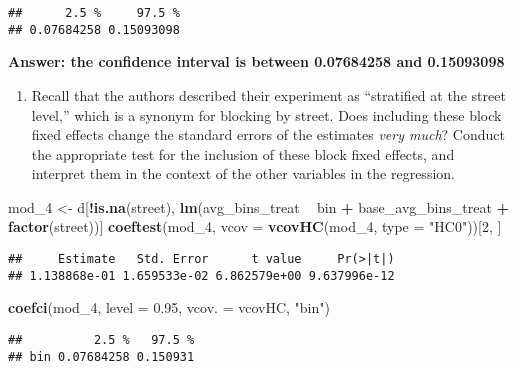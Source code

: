\documentclass[
]{article}
\newenvironment{Shaded}{\begin{snugshade}}{\end{snugshade}}
\newcommand{\DataTypeTok}[1]{\textcolor[rgb]{0.13,0.29,0.53}{#1}}
\newcommand{\DecValTok}[1]{\textcolor[rgb]{0.00,0.00,0.81}{#1}}
\newcommand{\FloatTok}[1]{\textcolor[rgb]{0.00,0.00,0.81}{#1}}
\newcommand{\KeywordTok}[1]{\textcolor[rgb]{0.13,0.29,0.53}{\textbf{#1}}}
\newcommand{\NormalTok}[1]{#1}
\newcommand{\OperatorTok}[1]{\textcolor[rgb]{0.81,0.36,0.00}{\textbf{#1}}}
\newcommand{\StringTok}[1]{\textcolor[rgb]{0.31,0.60,0.02}{#1}}
\providecommand{\tightlist}{%
  \setlength{\itemsep}{0pt}\setlength{\parskip}{0pt}}
\begin{document}
\begin{verbatim}
##      2.5 %     97.5 % 
## 0.07684258 0.15093098
\end{verbatim}

\textbf{Answer: the confidence interval is between 0.07684258 and
0.15093098}

\begin{enumerate}
\def\labelenumi{\arabic{enumi}.}
\setcounter{enumi}{3}
\tightlist
\item
  Recall that the authors described their experiment as ``stratified at
  the street level,'' which is a synonym for blocking by street. Does
  including these block fixed effects change the standard errors of the
  estimates \emph{very much}? Conduct the appropriate test for the
  inclusion of these block fixed effects, and interpret them in the
  context of the other variables in the regression.
\end{enumerate}

\begin{Shaded}
\begin{Highlighting}[]
\NormalTok{mod_}\DecValTok{4}\NormalTok{ <-}\StringTok{ }\NormalTok{d[}\OperatorTok{!}\KeywordTok{is.na}\NormalTok{(street), }\KeywordTok{lm}\NormalTok{(avg_bins_treat }\OperatorTok{~}\StringTok{ }\NormalTok{bin }\OperatorTok{+}\StringTok{ }\NormalTok{base_avg_bins_treat }\OperatorTok{+}\StringTok{ }\KeywordTok{factor}\NormalTok{(street))]}
\KeywordTok{coeftest}\NormalTok{(mod_}\DecValTok{4}\NormalTok{, }\DataTypeTok{vcov =} \KeywordTok{vcovHC}\NormalTok{(mod_}\DecValTok{4}\NormalTok{, }\DataTypeTok{type =} \StringTok{"HC0"}\NormalTok{))[}\DecValTok{2}\NormalTok{, ]}
\end{Highlighting}
\end{Shaded}

\begin{verbatim}
##     Estimate   Std. Error      t value     Pr(>|t|) 
## 1.138868e-01 1.659533e-02 6.862579e+00 9.637996e-12
\end{verbatim}

\begin{Shaded}
\begin{Highlighting}[]
\KeywordTok{coefci}\NormalTok{(mod_}\DecValTok{4}\NormalTok{, }\DataTypeTok{level =} \FloatTok{0.95}\NormalTok{, }\DataTypeTok{vcov. =}\NormalTok{ vcovHC, }\StringTok{"bin"}\NormalTok{)}
\end{Highlighting}
\end{Shaded}

\begin{verbatim}
##          2.5 %   97.5 %
## bin 0.07684258 0.150931
\end{verbatim}
\end{document}
